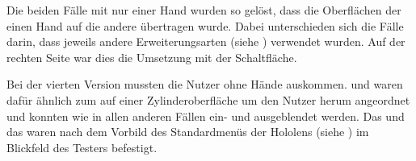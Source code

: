 			Die beiden Fälle mit nur einer Hand wurden so gelöst, dass die Oberflächen der einen Hand auf die andere übertragen wurde. Dabei unterschieden sich die Fälle darin, dass jeweils andere Erweiterungsarten (siehe ) verwendet wurden. Auf der rechten Seite war dies die Umsetzung mit der Schaltfläche.
			
			Bei der vierten Version mussten die Nutzer ohne Hände auskommen.  und  waren dafür ähnlich zum  auf einer Zylinderoberfläche um den Nutzer herum angeordnet und konnten wie in allen anderen Fällen ein- und ausgeblendet werden. Das  und das  waren nach dem Vorbild des Standardmenüs der Hololens (siehe ) im Blickfeld des Testers befestigt. 
			
		